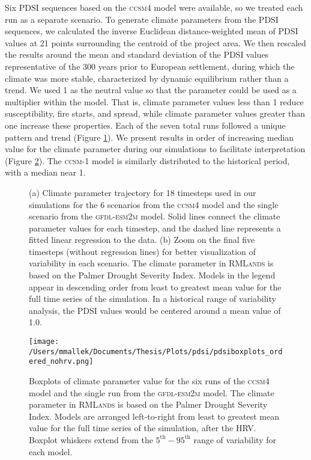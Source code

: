 Six PDSI sequences based on the \textsc{ccsm4} model were available, so we treated each run as a separate scenario. To generate climate parameters from the PDSI sequences, we calculated the inverse Euclidean distance-weighted mean of PDSI values at 21 points surrounding the centroid of the project area. We then rescaled the results around the mean and standard deviation of the PDSI values representative of the 300 years prior to European settlement, during which the climate was more stable, characterized by dynamic equilibrium rather than a trend. We used 1 as the neutral value so that the parameter could be used as a multiplier within the model. That is, climate parameter values less than 1 reduce susceptibility, fire starts, and spread, while climate parameter values greater than one increase these properties. Each of the seven total runs followed a unique pattern and trend (Figure \ref{fig:pdsi_future}). We present results in order of increasing median value for the climate parameter during our simulations to facilitate interpretation (Figure \ref{pdsi-boxplots}). The \textsc{ccsm-1} model is similarly distributed to the historical period, with a median near 1.


\begin{figure}[!htbp]
\centering
	\caption{(a) Climate parameter trajectory for 18 timesteps used in our simulations for the 6 scenarios from the \textsc{ccsm4} model and the single scenario from the \textsc{gfdl-esm2m} model. Solid lines connect the climate parameter values for each timestep, and the dashed line represents a fitted linear regression to the data. (b) Zoom on the final five timesteps (without regression lines) for better visualization of variability in each scenario. The climate parameter in \textsc{RMLands} is based on the Palmer Drought Severity Index. Models in the legend appear in descending order from least to greatest mean value for the full time series of the simulation. In a historical range of variability analysis, the PDSI values would be centered around a mean value of 1.0.}
\label{fig:pdsi_future}

\end{figure}

\begin{figure}[!htbp]
\centering
\texttt{[image: /Users/mmallek/Documents/Thesis/Plots/pdsi/pdsiboxplots\_ordered\_nohrv.png]}
\caption{Boxplots of climate parameter value for the six runs of the \textsc{ccsm4} model and the single run from the \textsc{gfdl-esm2m} model.  The climate parameter in \textsc{RMLands} is based on the Palmer Drought Severity Index. Models are arranged left-to-right from least to greatest mean value for the full time series of the simulation, after the HRV. Boxplot whiskers extend from the $5^{\text{th}}-95^{\text{th}}$ range of variability for each model.}
\label{pdsi-boxplots}
\end{figure}


